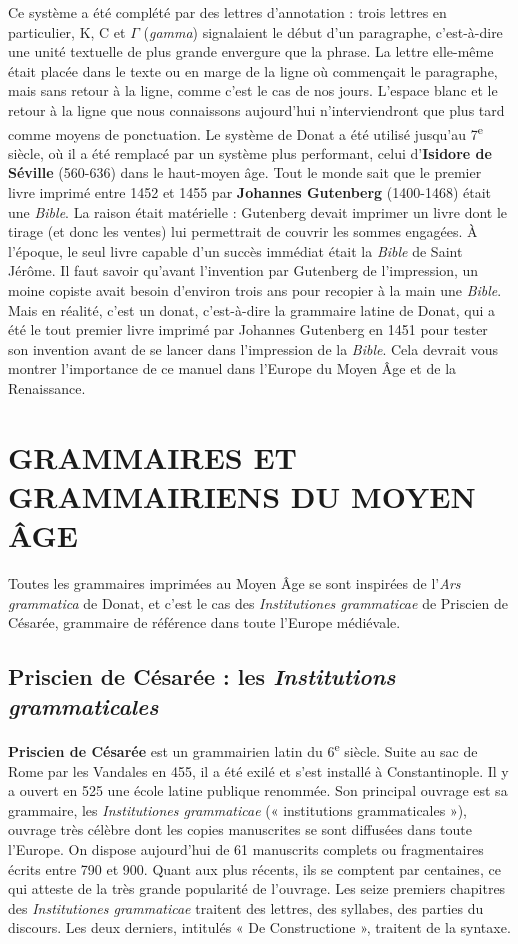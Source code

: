 Ce système a été complété par des lettres d’annotation : trois lettres en particulier, K, C et $\Gamma$ (\textit{gamma}) signalaient le début d’un paragraphe, c’est-à-dire une unité textuelle de plus grande envergure que la phrase. La lettre elle-même était placée dans le texte ou en marge de la ligne où commençait le paragraphe, mais sans retour à la ligne, comme c’est le cas de nos jours. L’espace blanc et le retour à la ligne que nous connaissons aujourd’hui n’interviendront que plus tard comme moyens de ponctuation. Le système de Donat a été utilisé jusqu’au 7\textsuperscript{e} siècle, où il a été remplacé par un système plus performant, celui d’\textbf{Isidore de Séville} (560-636) dans le haut-moyen âge.
Tout le monde sait que le premier livre imprimé entre 1452 et 1455 par \textbf{Johannes Gutenberg} (1400-1468) était une \textit{Bible}. La raison était matérielle : Gutenberg devait imprimer un livre dont le tirage (et donc les ventes) lui permettrait de couvrir les sommes engagées. À l’époque, le seul livre capable d’un succès immédiat était la \textit{Bible} de Saint Jérôme. Il faut savoir qu’avant l’invention par Gutenberg de l’impression, un moine copiste avait besoin d’environ trois ans pour recopier à la main une \textit{Bible}. Mais en réalité, c’est un donat, c’est-à-dire la grammaire latine de Donat, qui a été le tout premier livre imprimé par Johannes Gutenberg en 1451 pour tester son invention avant de se lancer dans l’impression de la \textit{Bible}.
Cela devrait vous montrer l’importance de ce manuel dans l’Europe du Moyen Âge et de la Renaissance.
\section{GRAMMAIRES ET GRAMMAIRIENS DU MOYEN ÂGE}
Toutes les grammaires imprimées au Moyen Âge se sont inspirées de l’\textit{Ars grammatica} de Donat, et c’est le cas des \textit{Institutiones grammaticae} de Priscien de Césarée, grammaire de référence dans toute l’Europe médiévale.
\subsection{Priscien de Césarée : les \textit{Institutions grammaticales}}
\textbf{Priscien de Césarée} est un grammairien latin du 6\textsuperscript{e} siècle. Suite au sac de Rome par les Vandales en 455, il a été exilé et s’est installé à Constantinople. Il y a ouvert en 525 une école latine publique renommée. Son principal ouvrage est sa grammaire, les \textit{Institutiones grammaticae} (« institutions grammaticales »), ouvrage très célèbre dont les copies manuscrites se sont diffusées dans toute l’Europe. On dispose aujourd’hui de 61 manuscrits complets ou fragmentaires écrits entre 790 et 900. Quant aux plus récents, ils se comptent par centaines, ce qui atteste de la très grande popularité de l’ouvrage. Les seize premiers chapitres des \textit{Institutiones grammaticae} traitent des lettres, des syllabes, des parties du discours. Les deux derniers, intitulés « De Constructione », traitent de la syntaxe.
